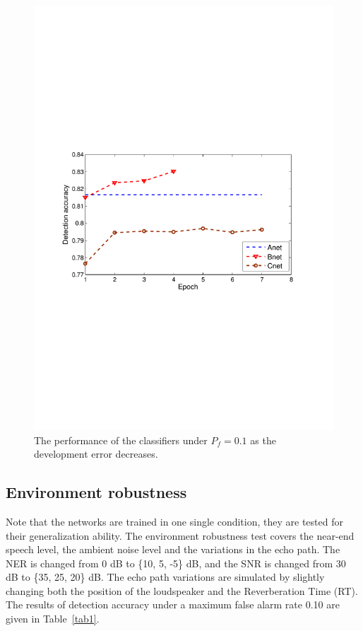 \documentclass[a4paper]{article}
\begin{document}
\begin{figure}[t]
  \centering
  \includegraphics[width=0.95\linewidth]{fig5_epoch.pdf}
  \caption{The performance of the classifiers under $P_f=0.1$ as the development error decreases.}
  \label{fig5}
\end{figure}


\subsection{Environment robustness}

Note that the networks are trained in one single condition, they are tested for their generalization ability. The environment robustness test covers the near-end speech level, the ambient noise level and the variations in the echo path. The NER is changed from 0 dB to \{10, 5, -5\} dB, and the SNR is changed from 30 dB to \{35, 25, 20\} dB. The echo path variations are simulated by slightly changing both the position of the loudspeaker and the Reverberation Time (RT). The results of detection accuracy under a maximum false alarm rate 0.10 are given in Table~\ref{tab1}.
\end{document}
